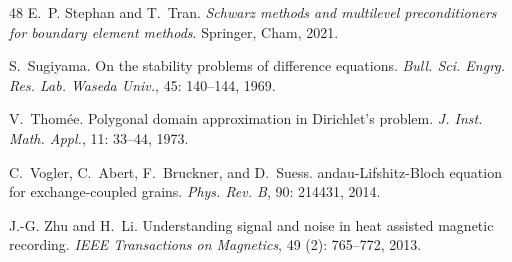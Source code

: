 \documentclass[11pt,reqno]{amsart}
\theoremstyle{definition}
\numberwithin{equation}{section}
\begin{document}
\begin{thebibliography}{48}
	E.~P. Stephan and T.~Tran.
	\newblock \emph{Schwarz methods and multilevel preconditioners for boundary
		element methods}.
	\newblock Springer, Cham, 2021.
	
	S.~Sugiyama.
	\newblock On the stability problems of difference equations.
	\newblock \emph{Bull. Sci. Engrg. Res. Lab. Waseda Univ.}, 45:
	140--144, 1969.
	
	V.~Thom\'ee.
	\newblock Polygonal domain approximation in {D}irichlet's problem.
	\newblock \emph{J. Inst. Math. Appl.}, 11: 33--44, 1973.
	
	C.~Vogler, C.~Abert, F.~Bruckner, and D.~Suess.
	andau-{L}ifshitz-{B}loch equation for exchange-coupled grains.
	\newblock \emph{Phys. Rev. B}, 90: 214431, 2014.
	
	J.-G. Zhu and H.~Li.
	\newblock Understanding signal and noise in heat assisted magnetic recording.
	\newblock \emph{IEEE Transactions on Magnetics}, 49 (2):
	765--772, 2013.
	
\end{thebibliography}
\end{document}

